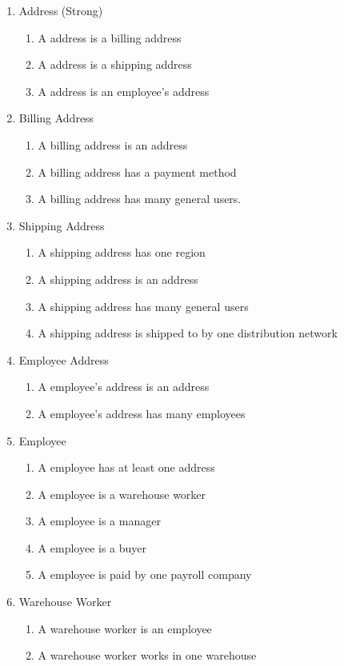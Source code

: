 \documentclass{article}
\begin{document}
\begin{enumerate}
\item Address (Strong)
\begin{enumerate}
	\item A address is a billing address
	\item A address is a shipping address
	\item A address is an employee's address
\end{enumerate}
	
\item Billing Address
\begin{enumerate}
	\item A billing address is an address
	\item A billing address has a payment method
	\item A billing address has many general users.
\end{enumerate}
	
\item Shipping Address
\begin{enumerate}
	\item A shipping address has one region
	\item A shipping address is an address
	\item A shipping address has many general users
	\item A shipping address is shipped to by one distribution network
\end{enumerate}
	
\item Employee Address
\begin{enumerate}
	\item A employee's address is an address
	\item A employee's address has many employees
\end{enumerate}
	
\item Employee
\begin{enumerate}
	\item A employee has at least one address
	\item A employee is a warehouse worker
	\item A employee is a manager
	\item A employee is a buyer
	\item A employee is paid by one payroll company
\end{enumerate}

\item Warehouse Worker
\begin{enumerate}
	\item A warehouse worker is an employee
	\item A warehouse worker works in one warehouse
\end{enumerate}


\end{enumerate}
\end{document}
